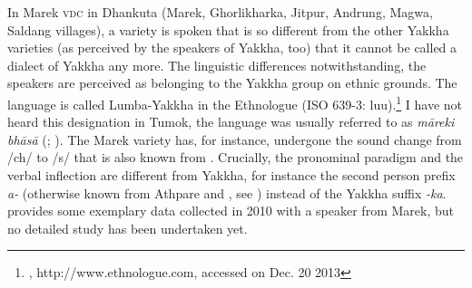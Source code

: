 \begin{table}
\caption{Dialectal variation within the Yakkha region}\label{dialects}
\end{table}



In Marek \textsc{vdc} in Dhankuta (Marek, Ghorlikharka, Jitpur, Andrung, Magwa, Saldang villages),  a variety is spoken that is so different from the other Yakkha varieties (as perceived by  the speakers of Yakkha, too) that it cannot be called a dialect of Yakkha any more. The linguistic differences notwithstanding, the speakers are perceived as belonging to the Yakkha group on ethnic grounds. The language is called Lumba-Yakkha in the Ethnologue (ISO 639-3: luu).\footnote{\citet{Levisetal2015_Ethnologue}, http://www.ethnologue.com, accessed on Dec. 20 2013} I have not heard this designation in Tumok, the language was usually referred to as \emph{māreki bhāsā} (; ). The Marek variety has, for instance, undergone the sound change from /ch/ to /s/ that is also known from . Crucially, the pronominal paradigm and the verbal inflection are different from Yakkha, for instance the second person prefix \emph{a-}  (otherwise known from Athpare and , see \citealt{Ebert1997A-grammar, Bickeletal2007Free}) instead of the Yakkha suffix \emph{-ka}.  provides some exemplary data collected in 2010 with a speaker from Marek, but no detailed study has been undertaken yet. 

